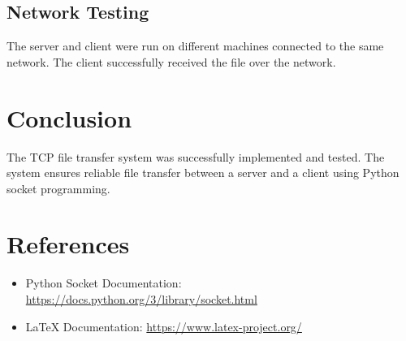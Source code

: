 \documentclass[a4paper,12pt]{article}
\begin{document}
\subsection*{Network Testing}
The server and client were run on different machines connected to the same network. The client successfully received the file over the network.

\section*{Conclusion}
The TCP file transfer system was successfully implemented and tested. The system ensures reliable file transfer between a server and a client using Python socket programming.

\section*{References}
\begin{itemize}
    \item Python Socket Documentation: \url{https://docs.python.org/3/library/socket.html}
    \item LaTeX Documentation: \url{https://www.latex-project.org/}
\end{itemize}
\end{document}
